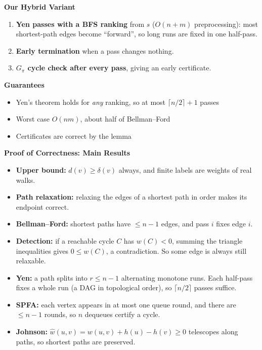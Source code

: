 \documentclass[11pt]{article}
\newcommand{\slide}[1]{\newpage\raggedright{\color{acc}\Large\bfseries #1\par}\vspace{1pt}{\color{acc}\rule{\linewidth}{0.8pt}}\par\vspace{5pt}}
\begin{document}
\slide{Our Hybrid Variant}
\begin{minipage}[t]{0.55\linewidth}
\begin{enumerate}
\item \textbf{Yen passes with a BFS ranking} from $s$ ($O(n+m)$ preprocessing): most shortest-path edges become ``forward'', so long runs are fixed in one half-pass.
\item \textbf{Early termination} when a pass changes nothing.
\item \textbf{$G_\pi$ cycle check after every pass}, giving an early certificate.
\end{enumerate}
\end{minipage}\hfill
\begin{minipage}[t]{0.41\linewidth}
\textbf{Guarantees}
\begin{itemize}
\item Yen's theorem holds for \emph{any} ranking, so at most $\lceil n/2\rceil+1$ passes
\item Worst case $O(nm)$, about half of Bellman--Ford
\item Certificates are correct by the lemma
\end{itemize}
\end{minipage}

\slide{Proof of Correctness: Main Results}
\begin{itemize}
\item \textbf{Upper bound:} $d(v)\ge\delta(v)$ always, and finite labels are weights of real walks.
\item \textbf{Path relaxation:} relaxing the edges of a shortest path in order makes its endpoint correct.
\item \textbf{Bellman--Ford:} shortest paths have $\le n-1$ edges, and pass $i$ fixes edge $i$.
\item \textbf{Detection:} if a reachable cycle $C$ has $w(C)<0$, summing the triangle inequalities gives $0\le w(C)$, a contradiction. So some edge is always still relaxable.
\item \textbf{Yen:} a path splits into $r\le n-1$ alternating monotone runs. Each half-pass fixes a whole run (a DAG in topological order), so $\lceil n/2\rceil$ passes suffice.
\item \textbf{SPFA:} each vertex appears in at most one queue round, and there are $\le n-1$ rounds, so $n$ dequeues certify a cycle.
\item \textbf{Johnson:} $\hat w(u,v)=w(u,v)+h(u)-h(v)\ge0$ telescopes along paths, so shortest paths are preserved.
\end{itemize}
\end{document}
